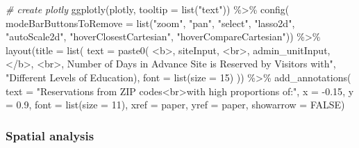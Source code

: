 \documentclass[
  11 pt,
  openany]{book}
\newenvironment{Shaded}{\begin{snugshade}}{\end{snugshade}}
\newcommand{\AttributeTok}[1]{\textcolor[rgb]{0.77,0.63,0.00}{#1}}
\newcommand{\CommentTok}[1]{\textcolor[rgb]{0.56,0.35,0.01}{\textit{#1}}}
\newcommand{\ConstantTok}[1]{\textcolor[rgb]{0.00,0.00,0.00}{#1}}
\newcommand{\DecValTok}[1]{\textcolor[rgb]{0.00,0.00,0.81}{#1}}
\newcommand{\FloatTok}[1]{\textcolor[rgb]{0.00,0.00,0.81}{#1}}
\newcommand{\FunctionTok}[1]{\textcolor[rgb]{0.00,0.00,0.00}{#1}}
\newcommand{\NormalTok}[1]{#1}
\newcommand{\SpecialCharTok}[1]{\textcolor[rgb]{0.00,0.00,0.00}{#1}}
\newcommand{\StringTok}[1]{\textcolor[rgb]{0.31,0.60,0.02}{#1}}
\begin{document}
\begin{Shaded}
\begin{Highlighting}[]
\CommentTok{\# create plotly}
\FunctionTok{ggplotly}\NormalTok{(plotly,}
         \AttributeTok{tooltip =} \FunctionTok{list}\NormalTok{(}\StringTok{"text"}\NormalTok{)) }\SpecialCharTok{\%\textgreater{}\%}
  \FunctionTok{config}\NormalTok{(}
    \AttributeTok{modeBarButtonsToRemove =} 
      \FunctionTok{list}\NormalTok{(}\StringTok{"zoom"}\NormalTok{, }\StringTok{"pan"}\NormalTok{, }\StringTok{"select"}\NormalTok{, }\StringTok{"lasso2d"}\NormalTok{, }\StringTok{"autoScale2d"}\NormalTok{,}
           \StringTok{"hoverClosestCartesian"}\NormalTok{, }\StringTok{"hoverCompareCartesian"}\NormalTok{)) }\SpecialCharTok{\%\textgreater{}\%}
  \FunctionTok{layout}\NormalTok{(}\AttributeTok{title =} \FunctionTok{list}\NormalTok{(}
    \AttributeTok{text =} \FunctionTok{paste0}\NormalTok{( }\StringTok{\textquotesingle{}\textless{}b\textgreater{}\textquotesingle{}}\NormalTok{, siteInput, }\StringTok{\textquotesingle{}\textless{}br\textgreater{}\textquotesingle{}}\NormalTok{, admin\_unitInput, }\StringTok{\textquotesingle{}\textless{}/b\textgreater{}\textquotesingle{}}\NormalTok{, }\StringTok{\textquotesingle{}\textless{}br\textgreater{}\textquotesingle{}}\NormalTok{,}
                   \StringTok{\textquotesingle{}Number of Days in Advance Site is Reserved by Visitors with", }
\StringTok{                   "Different Levels of Education\textquotesingle{}}\NormalTok{),}
    \AttributeTok{font =} \FunctionTok{list}\NormalTok{(}\AttributeTok{size =} \DecValTok{15}\NormalTok{) )) }\SpecialCharTok{\%\textgreater{}\%}
  \FunctionTok{add\_annotations}\NormalTok{(}
    \AttributeTok{text =} \StringTok{"Reservations from ZIP codes\textless{}br\textgreater{}with high proportions of:"}\NormalTok{,}
    \AttributeTok{x =} \SpecialCharTok{{-}}\FloatTok{0.15}\NormalTok{, }\AttributeTok{y =} \FloatTok{0.9}\NormalTok{, }
    \AttributeTok{font =} \FunctionTok{list}\NormalTok{(}\AttributeTok{size =} \DecValTok{11}\NormalTok{),}
    \AttributeTok{xref =} \StringTok{\textquotesingle{}paper\textquotesingle{}}\NormalTok{, }\AttributeTok{yref =} \StringTok{\textquotesingle{}paper\textquotesingle{}}\NormalTok{, }
    \AttributeTok{showarrow =} \ConstantTok{FALSE}\NormalTok{)}
\end{Highlighting}
\end{Shaded}

\hypertarget{spatial-analysis}{%
\subsubsection{Spatial analysis}\label{spatial-analysis}}
\end{document}
